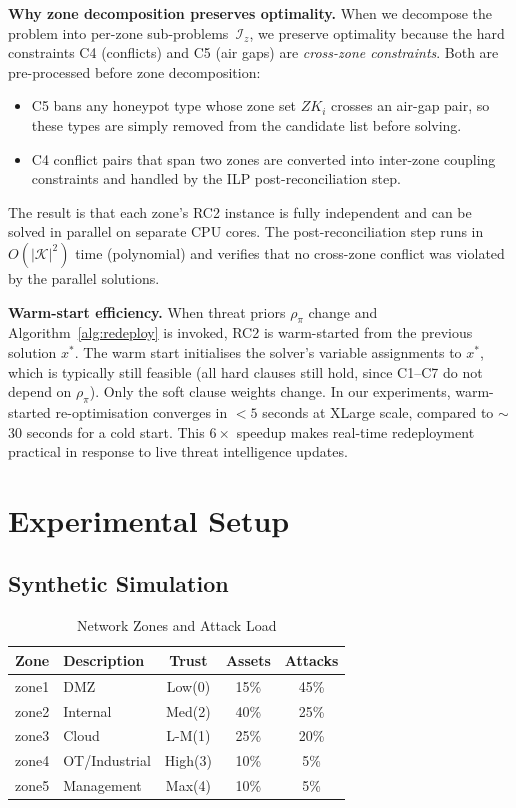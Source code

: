 \documentclass[journal]{IEEEtran}
\newcommand{\calK}{\mathcal{K}}
\begin{document}
\textbf{Why zone decomposition preserves optimality.}
When we decompose the problem into per-zone
sub-problems~$\mathcal{I}_z$, we preserve optimality
because the hard constraints C4 (conflicts) and C5
(air gaps) are \emph{cross-zone constraints}.
Both are pre-processed before zone decomposition:
\begin{itemize}
  \item C5 bans any honeypot type whose zone set $ZK_i$
        crosses an air-gap pair, so these types are simply
        removed from the candidate list before solving.
  \item C4 conflict pairs that span two zones are
        converted into inter-zone coupling constraints and
        handled by the ILP post-reconciliation step.
\end{itemize}
The result is that each zone's RC2 instance is fully
independent and can be solved in parallel on separate CPU
cores.
The post-reconciliation step runs in $O(|\calK|^2)$ time
(polynomial) and verifies that no cross-zone conflict was
violated by the parallel solutions.

\textbf{Warm-start efficiency.}
When threat priors $\rho_\pi$ change and
Algorithm~\ref{alg:redeploy} is invoked, RC2 is
warm-started from the previous solution $x^*$.
The warm start initialises the solver's variable
assignments to $x^*$, which is typically still feasible
(all hard clauses still hold, since C1--C7 do not depend
on $\rho_\pi$).
Only the soft clause weights change.
In our experiments, warm-started re-optimisation
converges in $<5$ seconds at XLarge scale, compared
to $\sim$30 seconds for a cold start.
This $6\times$ speedup makes real-time redeployment
practical in response to live threat intelligence updates.

\FloatBarrier
\section{Experimental Setup}
\label{sec:methodology}

\subsection{Synthetic Simulation}

\begin{table}[htbp]
\caption{Network Zones and Attack Load}
\label{tab:zones}
\centering\renewcommand{\arraystretch}{1.2}
\begin{tabular}{@{}llccc@{}}
\toprule
\textbf{Zone}&\textbf{Description}&\textbf{Trust}&
\textbf{Assets}&\textbf{Attacks}\\
\midrule
zone1&DMZ&Low(0)&15\%&45\%\\
zone2&Internal&Med(2)&40\%&25\%\\
zone3&Cloud&L-M(1)&25\%&20\%\\
zone4&OT/Industrial&High(3)&10\%&5\%\\
zone5&Management&Max(4)&10\%&5\%\\
\bottomrule
\end{tabular}
\end{table}
\end{document}
